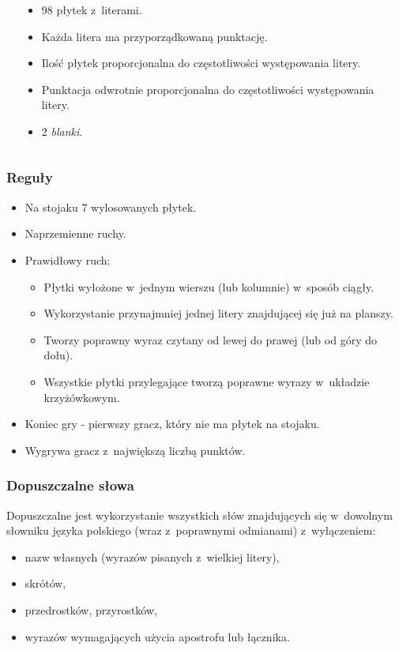 \documentclass[10pt,a4paper]{beamer}
\begin{document}
\begin{frame}
\begin{columns}[onlytextwidth]
\begin{column}{0.55\textwidth}
{\begin{tabular}{|c|c|c||c|c|c||c|c|c|}
					\hline
				\end{tabular}
			}
		\end{column}
		\begin{column}{0.45\textwidth}
			\begin{itemize}
				\item 98 płytek z~literami.
				\item Każda litera ma przyporządkowaną punktację.
				\item Ilość płytek proporcjonalna do częstotliwości występowania litery.
				\item Punktacja odwrotnie proporcjonalna do częstotliwości występowania litery.
				\item 2 \emph{blanki}.
			\end{itemize}
		\end{column}
	\end{columns}
\end{frame}

\begin{frame}
	\frametitle{Reguły}
	
	\begin{itemize}
		\item Na stojaku 7 wylosowanych płytek.
		\item Naprzemienne ruchy.
		\item Prawidłowy ruch:
			\begin{itemize}
				\item Płytki wyłożone w~jednym wierszu (lub kolumnie) w~sposób ciągły.
				\item Wykorzystanie przynajmniej jednej litery znajdującej się już na planszy.
				\item Tworzy poprawny wyraz czytany od lewej do prawej (lub od góry do dołu).
				\item Wszystkie płytki przylegające tworzą poprawne wyrazy w~układzie krzyżówkowym.
			\end{itemize}
		\item Koniec gry - pierwszy gracz, który nie ma płytek na stojaku.
		\item Wygrywa gracz z~największą liczbą punktów.
	\end{itemize}
\end{frame}

\begin{frame}
	\frametitle{Dopuszczalne słowa}
	
	Dopuszczalne jest wykorzystanie wszystkich słów znajdujących się w~dowolnym słowniku języka polskiego (wraz z~poprawnymi odmianami) z~wyłączeniem:
	
	\begin{itemize}
		\item nazw własnych (wyrazów pisanych z~wielkiej litery),
		\item skrótów,
		\item przedrostków, przyrostków,
		\item wyrazów wymagających użycia apostrofu lub łącznika.
	\end{itemize}
\end{frame}
\end{document}
